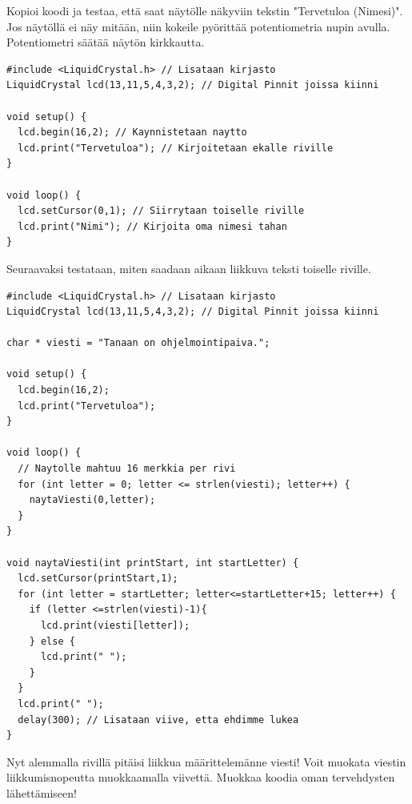 Kopioi koodi ja testaa, että saat näytölle näkyviin tekstin "Tervetuloa (Nimesi)". Jos näytöllä ei näy mitään, niin kokeile pyörittää potentiometria nupin avulla. Potentiometri säätää näytön kirkkautta. 

\begin{lstlisting}[numbers=none]
#include <LiquidCrystal.h> // Lisataan kirjasto 
LiquidCrystal lcd(13,11,5,4,3,2); // Digital Pinnit joissa kiinni

void setup() {
  lcd.begin(16,2); // Kaynnistetaan naytto
  lcd.print("Tervetuloa"); // Kirjoitetaan ekalle riville
}

void loop() {
  lcd.setCursor(0,1); // Siirrytaan toiselle riville
  lcd.print("Nimi"); // Kirjoita oma nimesi tahan
}
\end{lstlisting}

\clearpage
Seuraavaksi testataan, miten saadaan aikaan liikkuva teksti toiselle riville.

\begin{lstlisting}[numbers=none]
#include <LiquidCrystal.h> // Lisataan kirjasto 
LiquidCrystal lcd(13,11,5,4,3,2); // Digital Pinnit joissa kiinni

char * viesti = "Tanaan on ohjelmointipaiva.";

void setup() {
  lcd.begin(16,2);
  lcd.print("Tervetuloa");
}

void loop() {
  // Naytolle mahtuu 16 merkkia per rivi
  for (int letter = 0; letter <= strlen(viesti); letter++) {
    naytaViesti(0,letter);
  }
}

void naytaViesti(int printStart, int startLetter) {
  lcd.setCursor(printStart,1);
  for (int letter = startLetter; letter<=startLetter+15; letter++) {
    if (letter <=strlen(viesti)-1){
      lcd.print(viesti[letter]);
    } else {
      lcd.print(" ");
    }
  }
  lcd.print(" ");
  delay(300); // Lisataan viive, etta ehdimme lukea
}
\end{lstlisting}
Nyt alemmalla rivillä pitäisi liikkua määrittelemänne viesti! Voit muokata viestin liikkumisnopeutta muokkaamalla viivettä. Muokkaa koodia oman tervehdysten lähettämiseen!

